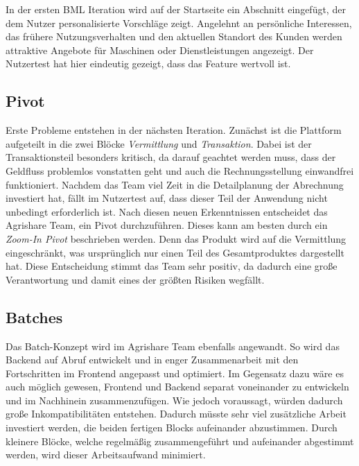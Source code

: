In der ersten \ac{BML} Iteration wird auf der Startseite ein Abschnitt eingefügt, der dem Nutzer personalisierte Vorschläge zeigt. Angelehnt an persönliche Interessen, das frühere Nutzungsverhalten und den aktuellen Standort des Kunden werden attraktive Angebote für Maschinen oder Dienstleistungen angezeigt. Der Nutzertest hat hier eindeutig gezeigt, dass das Feature wertvoll ist. 

\subsection*{\label{sec:LeanStartup-Umsetzung-Pivot}\thesubsection\quad Pivot}Erste Probleme entstehen in der nächsten Iteration. Zunächst ist die Plattform aufgeteilt in die zwei Blöcke \textit{Vermittlung} und \textit{Transaktion}. Dabei ist der Transaktionsteil besonders kritisch, da darauf geachtet werden muss, dass der Geldfluss problemlos vonstatten geht und auch die Rechnungsstellung einwandfrei funktioniert. Nachdem das Team viel Zeit in die Detailplanung der Abrechnung investiert hat, fällt im Nutzertest auf, dass dieser Teil der Anwendung nicht unbedingt erforderlich ist. Nach diesen neuen Erkenntnissen entscheidet das Agrishare Team, ein Pivot durchzuführen. Dieses kann am besten durch ein \textit{Zoom-In Pivot} beschrieben werden. Denn das Produkt wird auf die Vermittlung eingeschränkt, was ursprünglich nur einen Teil des Gesamtproduktes dargestellt hat. Diese Entscheidung stimmt das Team sehr positiv, da dadurch eine große Verantwortung und damit eines der größten Risiken wegfällt. 

\subsection*{\label{sec:LeanStartup-Umsetzung-Batches}\thesubsection\quad Batches}Das Batch-Konzept wird im Agrishare Team ebenfalls angewandt. So wird das Backend auf Abruf entwickelt und in enger Zusammenarbeit mit den Fortschritten im Frontend angepasst und optimiert. Im Gegensatz dazu wäre es auch möglich gewesen, Frontend und Backend separat voneinander zu entwickeln und im Nachhinein zusammenzufügen. Wie \citeauthor{Sprint} jedoch voraussagt, würden dadurch große Inkompatibilitäten entstehen. Dadurch müsste sehr viel zusätzliche Arbeit investiert werden, die beiden fertigen Blocks aufeinander abzustimmen. Durch kleinere Blöcke, welche regelmäßig zusammengeführt und aufeinander abgestimmt werden, wird dieser Arbeitsaufwand minimiert.


